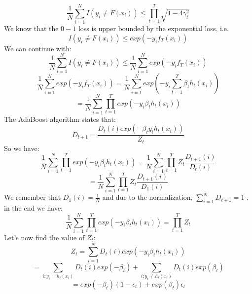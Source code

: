 \begin{equation*}
	\frac{1}{N}\sum_{i=1}^{N}I(y_i\neq F(x_i)) \leq \prod_{t=1}^{T}\sqrt{1 - 4\gamma^2_t}
\end{equation*}
We know that the $0-1$ loss is upper bounded by the exponential loss, i.e.
 \begin{equation*}
	I(y_i\neq F(x_i)) \leq exp(-y_if_T(x_i)) 
\end{equation*}
We can continue with:
\begin{equation*}
	\frac{1}{N}\sum_{i=1}^{N}I(y_i\neq F(x_i)) \leq \frac{1}{N}\sum_{i=1}^{N} exp(-y_if_T(x_i)) 
\end{equation*}
\begin{equation*}
	 \frac{1}{N}\sum_{i=1}^{N} exp(-y_if_T(x_i)) =  \frac{1}{N}\sum_{i=1}^{N} exp(-y_i\sum_{t=1}^{T}\beta_th_t(x_i)) 
\end{equation*}
\begin{equation*}
	 =  \frac{1}{N}\sum_{i=1}^{N} \prod_{t=1}^{T}exp(-y_i\beta_th_t(x_i)) 
\end{equation*}
The AdaBoost algorithm states that:
\begin{equation*}
	D_{t+1} = \frac{D_t(i)exp(-\beta_ty_ih_t(x_i))}{Z_t}
\end{equation*}
So we have:
\begin{equation*}
	\frac{1}{N}\sum_{i=1}^{N} \prod_{t=1}^{T}exp(-y_i\beta_th_t(x_i)) = \frac{1}{N}\sum_{i=1}^{N} \prod_{t=1}^{T}Z_t\frac{D_{t+1}(i)}{D_t(i)}
\end{equation*}
\begin{equation*}
	= \frac{1}{N}\sum_{i=1}^{N} \prod_{t=1}^{T}Z_t\frac{D_{t+1}(i)}{D_1(i)}
\end{equation*}
We remember that $D_1(i) = \frac{1}{N}$ and due to the normalization, $\sum_{i=1}^{N}D_{t+1} =1$ , in the end we have:
\begin{equation*}
	\frac{1}{N}\sum_{i=1}^{N} \prod_{t=1}^{T}exp(-y_i\beta_th_t(x_i)) = \prod_{t=1}^{T} Z_t
\end{equation*}
Let's now find the value of $Z_t$:
\begin{equation*}
	Z_t = \sum_{i=1}^{N}D_t(i)exp(-y_i\beta_t h_t(x_i))
\end{equation*} 
\begin{equation*}
	= \sum_{i:y_i=h_t(x_i)}D_t(i)exp(-\beta_t) +  \sum_{i:y_i\neq h_t(x_i)}D_t(i)exp(\beta_t)
\end{equation*} 
\begin{equation*}
	= exp(-\beta_t) (1 - \epsilon_t) + exp(\beta_t)\epsilon_t
\end{equation*} 
